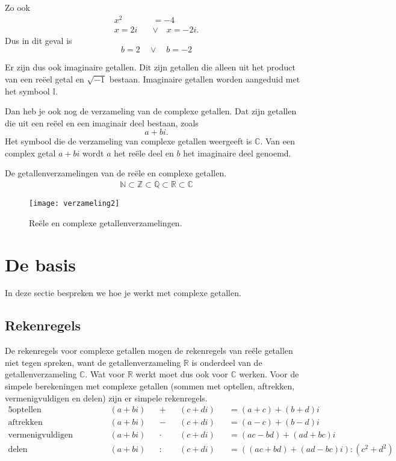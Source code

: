 \documentclass[11pt,fleqn]{book} %
\begin{document}
Zo ook
\begin{displaymath}
\begin{aligned}
x^2 &= -4\\
x=2i \quad &\vee\quad  x=-2i.
\end{aligned}
\end{displaymath}
Dus in dit geval is
\begin{displaymath}
b = 2 \quad  \vee \quad b = -2
\end{displaymath}

Er zijn dus ook imaginaire getallen. Dit zijn getallen die alleen uit het product van een reëel getal en $\sqrt{-1}$ bestaan. Imaginaire getallen worden aangeduid met het symbool $\mathbb{I}$.

Dan heb je ook nog de verzameling van de complexe getallen. Dat zijn getallen die uit een reëel en een imaginair deel bestaan, zoals
\begin{displaymath}
a + bi.
\end{displaymath}
Het symbool die de verzameling van complexe getallen weergeeft is $\mathbb{C}$. Van een complex getal $a + bi$ wordt $a$ het reële deel en $b$ het imaginaire deel genoemd.

\begin{definition}
De getallenverzamelingen van de reële en complexe getallen.
\begin{align}
\mathbb{N} \subset \mathbb{Z} \subset \mathbb{Q} \subset\mathbb{R} \subset \mathbb{C}
\end{align}
\end{definition}

\begin{figure}[h]
	\centering\texttt{[image: verzameling2]}
	\caption{Reële en complexe getallenverzamelingen.}
	\label{fig:verzameling2}
\end{figure}

\section{De basis}
In deze sectie bespreken we hoe je werkt met complexe getallen.
\subsection{Rekenregels}
De rekenregels voor complexe getallen mogen de rekenregels van reële getallen niet tegen spreken, want de getallenverzameling $\mathbb{R}$ is onderdeel van de getallenverzameling $\mathbb{C}$. Wat voor $\mathbb{R}$ werkt moet dus ook voor $\mathbb{C}$ werken. Voor de simpele berekeningen met complexe getallen (sommen met optellen, aftrekken, vermenigvuldigen en delen) zijn er simpele rekenregels.
\begin{alignat*}{5}
\text{optellen}& \qquad &&(a+bi) &&+ &&(c+di) &&=(a+c)+(b+d)i\\
\text{aftrekken}& \qquad &&(a+bi) &&- &&(c+di) &&=(a-c)+(b-d)i\\
\text{vermenigvuldigen}& \qquad &&(a+bi) &&\cdot &&(c+di) &&=(ac-bd)+(ad+bc)i\\
\text{delen}& \qquad &&(a+bi) &&: &&(c+di) &&=((ac+bd)+(ad-bc)i):(c^2+d^2)
\end{alignat*}
\end{document}
